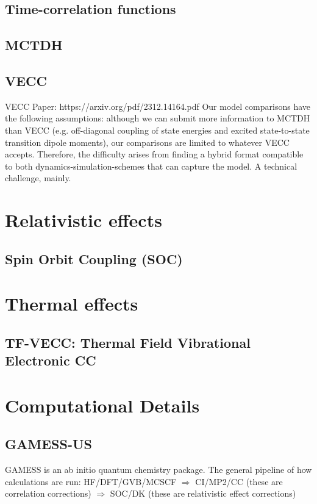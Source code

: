 \documentclass[letterpaper, 12pt, oneside]{report}
\begin{document}
    
    \subsection{Time-correlation functions}
    
    \subsection{MCTDH}
    
    \subsection{VECC}
    VECC Paper: https://arxiv.org/pdf/2312.14164.pdf
    Our model comparisons have the following assumptions: although we can submit more information to MCTDH than VECC (e.g. off-diagonal coupling of state energies and excited state-to-state transition dipole moments), our comparisons are limited to whatever VECC accepts. Therefore, the difficulty arises from finding a hybrid format compatible to both dynamics-simulation-schemes that can capture the model. A technical challenge, mainly.
\section{Relativistic effects}
    \subsection{Spin Orbit Coupling (SOC)}
\section{Thermal effects}
    \subsection{TF-VECC: Thermal Field Vibrational Electronic CC}
\section{Computational Details}
    \newpage
    \subsection{GAMESS-US}
    GAMESS is an ab initio quantum chemistry package. The general pipeline of how calculations are run: HF/DFT/GVB/MCSCF $\Rightarrow$ CI/MP2/CC (these are correlation corrections) $\Rightarrow$ SOC/DK (these are relativistic effect corrections)
\end{document}
